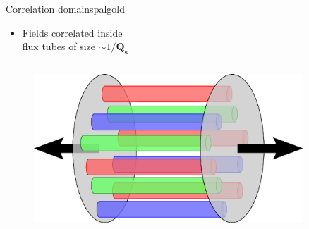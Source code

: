 \documentclass[aspectratio=169,11pt,usenames,dvipsnames]{beamer}
\begin{document}
\begin{frame}
\begin{columns}[onlytextwidth,t]
        \begin{custombox2}{{\normalsize Correlation domains}}{palgold}
            \begin{varwidth}{0.99\columnwidth}
            \begin{itemize}\itemsep0em 
                \scriptsize
                \item Fields correlated inside\\ flux tubes of size $\sim 1/\boldsymbol{Q_s}$ 
            \end{itemize}
            \end{varwidth}
        \end{custombox2}
 
    \end{columns}

    \begin{columns}[onlytextwidth,t]

        \vspace{5pt}
        \begin{center}
            \begin{figure}
                \centering
                \hspace{-5pt}\includegraphics[width=0.9\textwidth]{images/glasma.eps}
            \end{figure}
        \end{center}


\end{columns}
\end{frame}
\end{document}
